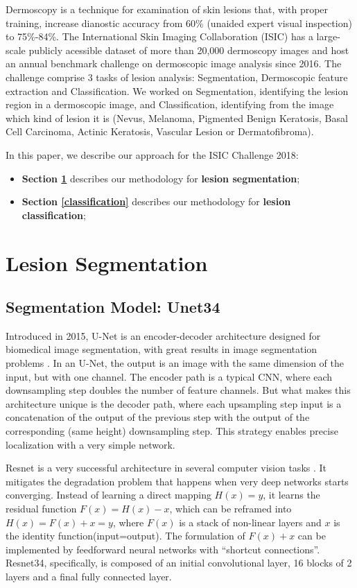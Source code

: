 \documentclass[conference]{IEEEtran}
\begin{document}
Dermoscopy is a technique for examination of skin lesions that, with proper training, increase dianostic accuracy from 60\% (unaided expert visual inspection) to 75\%-84\%\cite{isic}. The International Skin Imaging Collaboration (ISIC) has a large-scale publicly acessible dataset of more than 20,000 dermoscopy images and host an annual benchmark challenge on dermoscopic image analysis since 2016.  The challenge comprise 3 tasks of lesion analysis: Segmentation, Dermoscopic feature extraction and Classification. We worked on Segmentation, identifying the lesion region in a dermoscopic image, and Classification, identifying from the image which kind of lesion it is (Nevus, Melanoma, Pigmented Benign Keratosis, Basal Cell Carcinoma, Actinic Keratosis, Vascular Lesion or Dermatofibroma).

In this paper, we describe our approach for the ISIC Challenge 2018:
\begin{itemize}
\item \textbf{Section \ref{segmentation}} describes our methodology for \textbf{lesion segmentation};
\item \textbf{Section \ref{classification}} describes our methodology for \textbf{lesion classification};
\end{itemize}


\section{Lesion Segmentation}
\label{segmentation}

\subsection{Segmentation Model: Unet34}
Introduced in 2015, U-Net is an encoder-decoder architecture designed for biomedical image segmentation\cite{olaf}, with great results in image segmentation problems \cite{iglovikov}. In an U-Net, the output is an image with the same dimension of the input, but with one channel.  The encoder path is a typical CNN, where each downsampling step doubles the number of feature channels. But what makes this architecture unique is the decoder path, where each upsampling step input is a concatenation of the output of the previous step with the output of the corresponding (same height) downsampling step. This strategy enables precise localization with a very simple network. 

Resnet is a very successful architecture in several computer vision tasks \cite{he}. It mitigates the degradation problem that happens when very deep networks starts converging. Instead of learning a direct mapping $H(x) = y$, it learns the residual function  $F(x) = H(x)-x$, which can be reframed into $H(x) = F(x)+x = y$, where $F(x)$ is a stack of non-linear layers and $x$ is the identity function(input=output). The formulation of $F(x)+x$ can be implemented by feedforward neural networks with “shortcut connections”. Resnet34, specifically, is composed of an initial convolutional layer, 16 blocks of 2 layers and a final fully connected layer.
\end{document}
